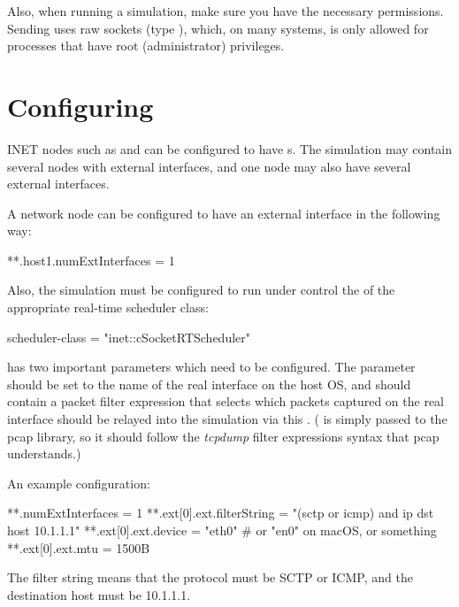 Also, when running a simulation, make sure you have the necessary permissions.
Sending uses raw sockets (type ), which, on many systems,
is only allowed for processes that have root (administrator) privileges.


\section{Configuring}
\label{sec:emulation:configuring}

INET nodes such as  and 
can be configured to have s.
The simulation may contain several nodes with external interfaces,
and one node may also have several external interfaces.

A network node can be configured to have an external interface
in the following way:

\begin{inifile}
**.host1.numExtInterfaces = 1
\end{inifile}

Also, the simulation must be configured to run under control the of the
appropriate real-time scheduler class:

\begin{inifile}
scheduler-class = "inet::cSocketRTScheduler"
\end{inifile}

 has two important parameters which need to be
configured. The  parameter should be set to the name of the real
interface on the host OS, and  should contain a packet
filter expression that selects which packets captured on the real interface
should  be relayed into the simulation via this .
( is simply passed to the pcap library, so it should
follow the \textit{tcpdump} filter expressions syntax that pcap understands.)

An example configuration:

\begin{inifile}
**.numExtInterfaces = 1
**.ext[0].ext.filterString = "(sctp or icmp) and ip dst host 10.1.1.1"
**.ext[0].ext.device = "eth0" # or "en0" on macOS, or something
**.ext[0].ext.mtu = 1500B
\end{inifile}

The filter string  means
that the protocol must be SCTP or ICMP, and the destination host must be
10.1.1.1.

